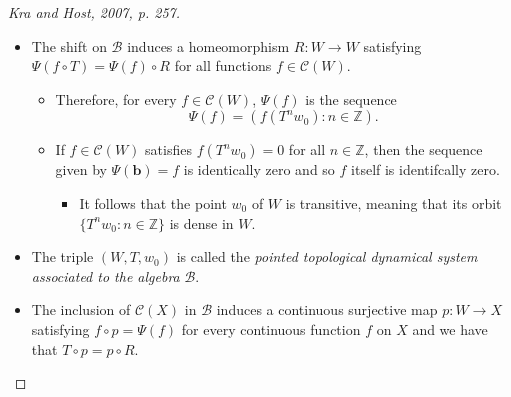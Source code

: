 \documentclass[
  british,
]{article}
\providecommand{\tightlist}{%
  \setlength{\itemsep}{0pt}\setlength{\parskip}{0pt}}
\theoremstyle{plain}
\theoremstyle{definition}
\theoremstyle{plain}
\theoremstyle{remark}
\begin{document}
\begin{proof}[{Kra and Host, 2007, p. 257}]
\begin{itemize}
\begin{itemize}
    \begin{itemize}
    \tightlist
    \item
      For \(\boldsymbol{b}\in\mathcal{B}\), the function
      \(\Psi^{-1}(\boldsymbol{b})\) is called \emph{the function
      associated to} \(\boldsymbol{b}\).
    \item
      The map \(\boldsymbol{b}\mapsto b_0\) is a character of the
      algebra \(\mathcal{B}\). Thus, there exists a point \(w_0\in W\)
      with \$f(w\_0)=\Psi(f)\_0 for all \(f\in\mathcal{C}(W)\)
    \end{itemize}
  \end{itemize}
\item
  The shift on \(\mathcal{B}\) induces a homeomorphism
  \(R:W\rightarrow W\) satisfying \(\Psi(f\circ T)=\Psi(f)\circ R\) for
  all functions \(f\in\mathcal{C}(W)\).

  \begin{itemize}
  \tightlist
  \item
    Therefore, for every \(f\in\mathcal{C}(W)\), \(\Psi(f)\) is the
    sequence \[\Psi(f)=\left(f(T^nw_0):n\in\mathbb{Z} \right). \]
  \item
    If \(f\in\mathcal{C}(W)\) satisfies \(f(T^nw_0)=0\) for all
    \(n\in\mathbb{Z}\), then the sequence given by
    \(\Psi(\boldsymbol{b})=f\) is identically zero and so \(f\) itself
    is identifcally zero.

    \begin{itemize}
    \tightlist
    \item
      It follows that the point \(w_0\) of \(W\) is transitive, meaning
      that its orbit \(\{T^nw_0:n\in\mathbb{Z}\}\) is dense in \(W\).
    \end{itemize}
  \end{itemize}
\item
  The triple \((W,T,w_0)\) is called the \emph{pointed topological
  dynamical system associated to the algebra} \(\mathcal{B}\).
\item
  The inclusion of \(\mathcal{C}(X)\) in \(\mathcal{B}\) induces a
  continuous surjective map \(p:W\rightarrow X\) satisfying
  \(f\circ p=\Psi(f)\) for every continuous function \(f\) on \(X\) and
  we have that \(T\circ p=p\circ R\).


\end{itemize}
\end{proof}
\end{document}
